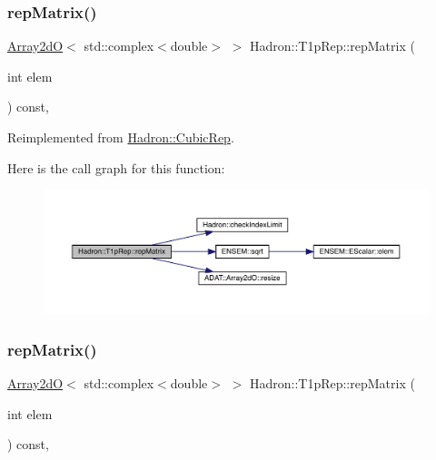 \subsubsection{\texorpdfstring{repMatrix()}{repMatrix()}\hspace{0.1cm}{\footnotesize\ttfamily [1/3]}}
{\footnotesize\ttfamily \mbox{\hyperlink{classADAT_1_1Array2dO}{Array2dO}}$<$ std\+::complex$<$double$>$ $>$ Hadron\+::\+T1p\+Rep\+::rep\+Matrix (\begin{DoxyParamCaption}\item[{int}]{elem }\end{DoxyParamCaption}) const\hspace{0.3cm}{\ttfamily [inline]}, {\ttfamily [virtual]}}



Reimplemented from \mbox{\hyperlink{structHadron_1_1CubicRep_ac5d7e9e6f4ab1158b5fce3e4ad9e8005}{Hadron\+::\+Cubic\+Rep}}.

Here is the call graph for this function\+:
\nopagebreak
\begin{figure}[H]
\begin{center}
\leavevmode
\includegraphics[width=350pt]{df/dba/structHadron_1_1T1pRep_ad013f454206c3e9f9b7c78db7812df97_cgraph}
\end{center}
\end{figure}
\mbox{\label{structHadron_1_1T1pRep_ad013f454206c3e9f9b7c78db7812df97}} 
\subsubsection{\texorpdfstring{repMatrix()}{repMatrix()}\hspace{0.1cm}{\footnotesize\ttfamily [2/3]}}
{\footnotesize\ttfamily \mbox{\hyperlink{classADAT_1_1Array2dO}{Array2dO}}$<$ std\+::complex$<$double$>$ $>$ Hadron\+::\+T1p\+Rep\+::rep\+Matrix (\begin{DoxyParamCaption}\item[{int}]{elem }\end{DoxyParamCaption}) const\hspace{0.3cm}{\ttfamily [inline]}, {\ttfamily [virtual]}}



